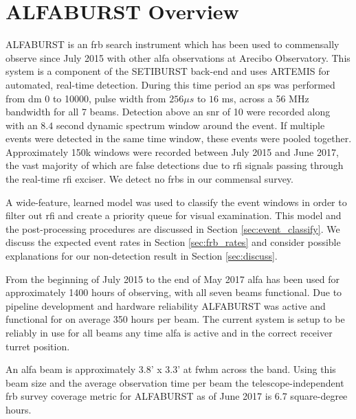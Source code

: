 \documentclass[a4paper,fleqn,usenatbib]{mnras}
\begin{document}
\section{ALFABURST Overview}

ALFABURST is an \gls*{frb} search instrument which has been used to commensally
observe since July 2015 with other \gls*{alfa} observations at Arecibo
Observatory. This system is a component of the SETIBURST back-end
\citep{2017ApJS..228...21C} and uses ARTEMIS \citep{2015MNRAS.452.1254K} for
automated, real-time detection. During this time period an \gls*{sps} was
performed from \gls*{dm} 0 to 10000, pulse width from $256 \mu s$ to $16$ ms,
across a 56 MHz bandwidth for all 7 beams. Detection above an \gls*{snr} of 10
were recorded along with an $8.4$ second dynamic spectrum window around the
event. If multiple events were detected in the same time window, these events
were pooled together.  Approximately 150k windows were recorded between July
2015 and June 2017, the vast majority of which are false detections due to
\gls*{rfi} signals passing through the real-time \gls*{rfi} exciser. We detect
no \glspl*{frb} in our commensal survey.

A wide-feature, learned model was used to classify the event windows in order to
filter out \gls*{rfi} and create a priority queue for visual examination. This
model and the post-processing procedures are discussed in Section
\ref{sec:event_classify}. We discuss the expected event rates in Section
\ref{sec:frb_rates} and consider possible explanations for our non-detection
result in Section \ref{sec:discuss}.


From the beginning of July 2015 to the end of May 2017 \gls*{alfa} has been used
for approximately 1400 hours of observing, with all seven beams functional. Due
to pipeline development and hardware reliability ALFABURST was active and
functional for on average 350 hours per beam.  The current system is setup to be
reliably in use for all beams any time \gls*{alfa} is active and in the correct
receiver turret position.

An \gls*{alfa} beam is approximately 3.8' x 3.3' at \gls*{fwhm} across the band.
Using this beam size and the average observation time per beam the
telescope-independent \gls*{frb} survey coverage metric for ALFABURST as of June
2017 is 6.7 square-degree hours.
\end{document}
